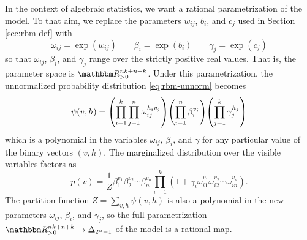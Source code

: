 \documentclass[11pt,titlepage]{article}
\numberwithin{equation}{section}
\begin{document}
    In the context of algebraic statistics, we want a rational parametrization
    of the model.  To that aim, we replace the parameters $w_{ij}$, $b_i$, and
    $c_j$ used in Section \ref{sec:rbm-def} with
    \[
        \omega_{ij} = \exp(w_{ij})
        \qquad
        \beta_i = \exp(b_i)
        \qquad
        \gamma_j = \exp(c_j)
    \]
    so that $\omega_{ij}$, $\beta_i$, and $\gamma_j$ range over the strictly
    positive real values.  That is, the parameter space is $\R_{>0}^{nk+n+k}$.
    Under this parametrization, the unnormalized probability distribution
    \eqref{eq:rbm-unnorm} becomes
    \[
        \psi(v, h) = 
            \pdil*{ \prod_{i=1}^k \prod_{j=1}^n \omega_{ij}^{h_i v_j} }
            \pdil*{ \prod_{i=1}^n \beta_i^{v_i} }
            \pdil*{ \prod_{j=1}^k \gamma_j^{h_j} }
    \]
    which is a polynomial in the variables $\omega_{ij}$, $\beta_i$, and
    $\gamma$ for any particular value of the binary vectors $(v,h)$.  The
    marginalized distribution over the visible variables factors as
    \begin{equation} \label{eq:rbm-alg-par}
        p(v) = \frac 1 Z
        \beta_1^{v_1} \beta_2^{v_2} \cdots \beta_n^{v_n} 
        \prod_{i=1}^k
        (1 + \gamma_i \omega_{i1}^{v_1} \omega_{i2}^{v_2} \cdots
        \omega_{in}^{v_n}).
    \end{equation}
    The partition function $Z = \sum_{v,h} \psi(v,h)$ is also a polynomial in
    the new parameters $\omega_{ij}$, $\beta_i$, and $\gamma_j$,  so the full
    parametrization $\R_{>0}^{nk+n+k} \to \Delta_{2^n-1}$ of the model is a
    rational map.  
\end{document}
